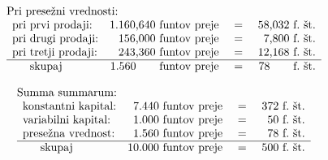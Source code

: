 \documentclass[kapital_02.tex]{subfiles}
\begin{document}
\KPEstran

\[
    \begin{array}{l}
        \textrm{Pri presežni vrednosti:} \\
        \begin{array}{l r c r}
            \textrm{pri prvi prodaji:} & \textrm{1.160,640 funtov preje} & \textrm{ = } & \textrm{58,032~f.~št.} \\
            \textrm{pri drugi prodaji:} & \textrm{156,000 funtov preje} & \textrm{ = } & \textrm{7,800~f.~št.} \\
            \textrm{pri tretji prodaji:} & \textrm{243,360 funtov preje} & \textrm{ = } & \textrm{12,168~f.~št.} \\
            \hline
            \phantom{--} \textrm{skupaj} & \textrm{1.560} \phantom{--} \thinspace \thinspace \thinspace \textrm{funtov preje} & \textrm{ = } & \textrm{78} \phantom{--} \thinspace \textrm{~f.~št.} \\
        \end{array} \\
    \end{array}
\]

\[
    \begin{array}{l}
        \textrm{Summa summarum:} \\
        \begin{array}{l r c r}
            \textrm{konstantni kapital:} & \textrm{7.440 funtov preje} & \textrm{ = } & \textrm{372~f.~št.} \\
            \textrm{variabilni kapital:} & \textrm{1.000 funtov preje} & \textrm{ = } & \textrm{50~f.~št.} \\
            \textrm{presežna vrednost:} & \textrm{1.560 funtov preje} & \textrm{ = } & \textrm{78~f.~št.} \\
            \hline
            \phantom{--} \textrm{skupaj} & \textrm{10.000 funtov preje} & \textrm{ = } & \textrm{500~f.~št.} \\
        \end{array} \\
    \end{array}
\]
\end{document}
